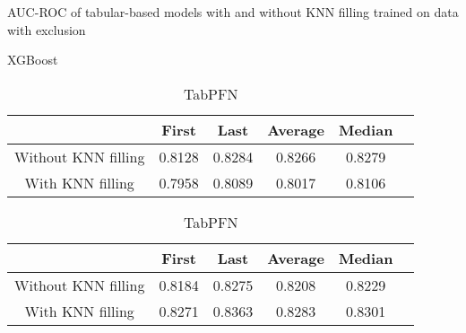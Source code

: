 \documentclass[../main.tex]{subfiles}
\begin{document}
\begin{table}[H]
    \centering
    \caption{AUC-ROC of tabular-based models with and without KNN filling trained on data with exclusion}
    \label{tab:knn_filling_with_limit}

    \begin{subtable}{\textwidth}
        \centering
        \caption{XGBoost}

        \begin{tabular}{|c|c|c|c|c|c|}
            \hline
            \textbf{} & 
            \textbf{First} & 
            \textbf{Last} & 
            \textbf{Average} &
            \textbf{Median} \\
            \hline

            Without KNN filling & 
            0.8128 & 
            0.8284 & 
            0.8266 &
            0.8279 \\

            With KNN filling & 
            0.7958 & 
            0.8089 & 
            0.8017 &
            0.8106 \\

            \hline
        \end{tabular}
    \end{subtable}

    \vspace{1cm}

    \begin{subtable}{\textwidth}
        \centering
        \caption{TabPFN}

        \begin{tabular}{|c|c|c|c|c|c|}
            \hline
            \textbf{} & 
            \textbf{First} & 
            \textbf{Last} & 
            \textbf{Average} &
            \textbf{Median} \\
            \hline

            Without KNN filling & 
            0.8184 & 
            0.8275 & 
            0.8208 &
            0.8229 \\

            With KNN filling & 
            0.8271 & 
            0.8363 & 
            0.8283 &
            0.8301 \\

            \hline
        \end{tabular}
    \end{subtable}

    \vspace{1cm}


\end{table}
\end{document}
